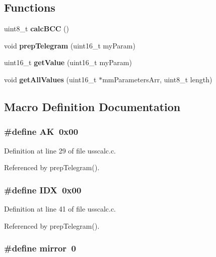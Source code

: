\subsection*{Functions}
\begin{DoxyCompactItemize}
\item 
uint8\+\_\+t {\bf calc\+B\+C\+C} ()
\item 
void {\bf prep\+Telegram} (uint16\+\_\+t my\+Param)
\item 
uint16\+\_\+t {\bf get\+Value} (uint16\+\_\+t my\+Param)
\item 
void {\bf get\+All\+Values} (uint16\+\_\+t $\ast$mm\+Parameters\+Arr, uint8\+\_\+t length)
\end{DoxyCompactItemize}


\subsection{Macro Definition Documentation}
\subsubsection[{A\+K}]{\setlength{\rightskip}{0pt plus 5cm}\#define A\+K~0x00}\label{usscalc_8c_ac3a341ede33bbed651abe7f847361a6e}


Definition at line 29 of file usscalc.\+c.



Referenced by prep\+Telegram().

\subsubsection[{I\+D\+X}]{\setlength{\rightskip}{0pt plus 5cm}\#define I\+D\+X~0x00}\label{usscalc_8c_a223697fc2f8a4423171d86ced5c8872b}


Definition at line 41 of file usscalc.\+c.



Referenced by prep\+Telegram().

\subsubsection[{mirror}]{\setlength{\rightskip}{0pt plus 5cm}\#define mirror~0}\label{usscalc_8c_ab75be13d6d9ba70e2a9591121b408184}


